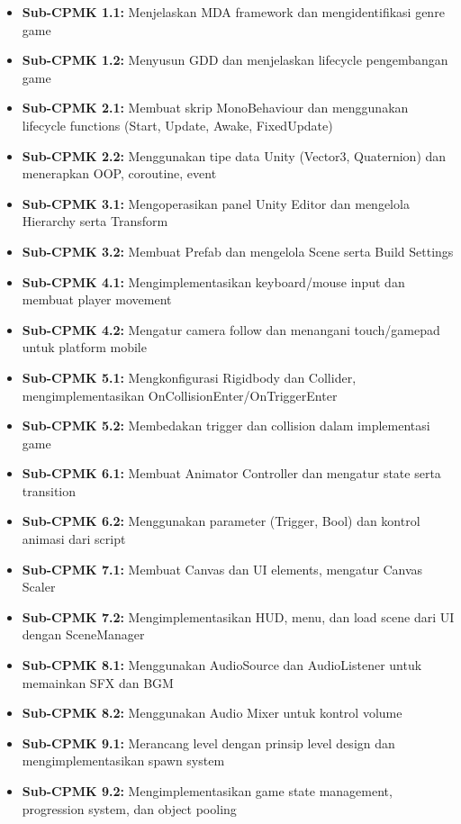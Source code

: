 \documentclass[12pt,a4paper]{article}
\begin{document}
\begin{itemize}[leftmargin=*]
  \item \textbf{Sub-CPMK 1.1:} Menjelaskan MDA framework dan mengidentifikasi genre game
  \item \textbf{Sub-CPMK 1.2:} Menyusun GDD dan menjelaskan lifecycle pengembangan game
  \item \textbf{Sub-CPMK 2.1:} Membuat skrip MonoBehaviour dan menggunakan lifecycle functions (Start, Update, Awake, FixedUpdate)
  \item \textbf{Sub-CPMK 2.2:} Menggunakan tipe data Unity (Vector3, Quaternion) dan menerapkan OOP, coroutine, event
  \item \textbf{Sub-CPMK 3.1:} Mengoperasikan panel Unity Editor dan mengelola Hierarchy serta Transform
  \item \textbf{Sub-CPMK 3.2:} Membuat Prefab dan mengelola Scene serta Build Settings
  \item \textbf{Sub-CPMK 4.1:} Mengimplementasikan keyboard/mouse input dan membuat player movement
  \item \textbf{Sub-CPMK 4.2:} Mengatur camera follow dan menangani touch/gamepad untuk platform mobile
  \item \textbf{Sub-CPMK 5.1:} Mengkonfigurasi Rigidbody dan Collider, mengimplementasikan OnCollisionEnter/OnTriggerEnter
  \item \textbf{Sub-CPMK 5.2:} Membedakan trigger dan collision dalam implementasi game
  \item \textbf{Sub-CPMK 6.1:} Membuat Animator Controller dan mengatur state serta transition
  \item \textbf{Sub-CPMK 6.2:} Menggunakan parameter (Trigger, Bool) dan kontrol animasi dari script
  \item \textbf{Sub-CPMK 7.1:} Membuat Canvas dan UI elements, mengatur Canvas Scaler
  \item \textbf{Sub-CPMK 7.2:} Mengimplementasikan HUD, menu, dan load scene dari UI dengan SceneManager
  \item \textbf{Sub-CPMK 8.1:} Menggunakan AudioSource dan AudioListener untuk memainkan SFX dan BGM
  \item \textbf{Sub-CPMK 8.2:} Menggunakan Audio Mixer untuk kontrol volume
  \item \textbf{Sub-CPMK 9.1:} Merancang level dengan prinsip level design dan mengimplementasikan spawn system
  \item \textbf{Sub-CPMK 9.2:} Mengimplementasikan game state management, progression system, dan object pooling

\end{itemize}
\end{document}
